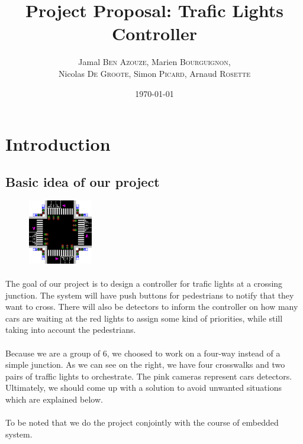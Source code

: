 \documentclass{article}
\title{Project Proposal: Trafic Lights Controller}
\author{Jamal \textsc{Ben Azouze}, Marien \textsc{Bourguignon},\\ Nicolas \textsc{De Groote}, Simon \textsc{Picard}, Arnaud \textsc{Rosette}} %
\date{\today} %
\begin{document}
\maketitle %


\section{Introduction}
\subsection{Basic idea of our project}
\begin{figure}
  \begin{center}
    \includegraphics[width=0.25\textwidth]{schema.png}
  \end{center}
\end{figure}
\paragraph{}
The goal of our project is to design a controller for trafic lights at a crossing junction. The system will have push buttons for pedestrians to notify that they want to cross.
There will also be detectors to inform the controller on how many cars are waiting at the red lights to assign some kind of priorities, while still taking into account the pedestrians.

\paragraph{}
Because we are a group of 6, we choosed to work on a four-way instead of a simple junction. As we can see on the right, we have four crosswalks and two pairs of traffic lights to orchestrate. The pink cameras represent cars detectors. Ultimately, we should come up with a solution to avoid unwanted situations which are explained below.

\paragraph{}
To be noted that we do the project conjointly with the course of embedded system.\\ 
\end{document}
